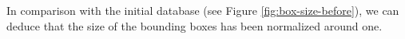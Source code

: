 \documentclass[10pt,twocolumn,letterpaper]{article}
\begin{document}
In comparison with the initial database (see Figure \ref{fig:box-size-before}), we can deduce that the size of the bounding boxes has been normalized around one.
\medskip
\printbibliography
\end{document}

